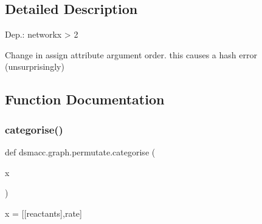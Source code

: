 \subsection{Detailed Description}
\begin{DoxyVerb}Dep.:
networkx > 2

Change in assign attribute argument order.
this causes a hash error (unsurprisingly)\end{DoxyVerb}
 

\subsection{Function Documentation}
\mbox{\label{namespacedsmacc_1_1graph_1_1permutate_ac0614585c1ae3a0bfd5ffe1608eed055}} 
\subsubsection{\texorpdfstring{categorise()}{categorise()}}
{\footnotesize\ttfamily def dsmacc.\+graph.\+permutate.\+categorise (\begin{DoxyParamCaption}\item[{}]{x }\end{DoxyParamCaption})}

\begin{DoxyVerb}x = [[reactants],rate]
\end{DoxyVerb}
 
